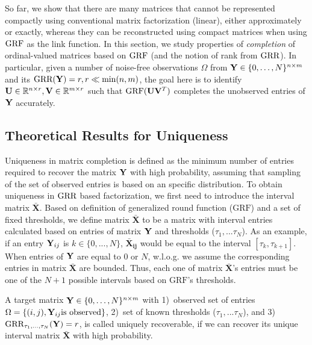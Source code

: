 \documentclass{article}
\newcommand{\sameer}[1]{\todo[color=blue!20]{\textbf{s:} #1}{}}
\begin{document}
So far, we show that there are many matrices that cannot be represented compactly using conventional matrix factorization (linear), either approximately or exactly, whereas they can be reconstructed using compact matrices when using $\text{GRF}$ as the link function.
In this section, we study properties of \emph{completion} of ordinal-valued matrices based on $\text{GRF}$ (and the notion of rank from $\text{GRR}$).
In particular, given a number of noise-free observations $\Omega$ from $\mathbf{Y}\in\{0,\ldots,N\}^{n\times m}$ and its $\text{GRR}(\mathbf{Y})=r, r\ll\min(n,m)$, the goal here is to identify $\mathbf{U}\in{\mathbb{R}}^{n\times r},\mathbf{V}\in{\mathbb{R}}^{m\times r}$ such that $\text{GRF}(\mathbf{U}\mathbf{V}^T)$ completes the unobserved entries of $\mathbf{Y}$ accurately.



\subsection{Theoretical Results for Uniqueness}

Uniqueness in matrix completion is defined as the minimum number of entries required to recover the matrix $\mathbf{Y}$ with high probability, assuming that sampling of the set of observed entries is based on an specific distribution. 
%
To obtain uniqueness in $\text{GRR}$ based factorization, we first need to introduce the interval matrix $\mathbf{\bar{X}}$. 
Based on definition of generalized round function ($\text{GRF}$) and a set of fixed thresholds, we define matrix $\mathbf{\bar X}$ to be a matrix with interval entries calculated based on entries of matrix $\mathbf{Y}$ and thresholds ($\tau_1,...\tau_N$). 
As an example, if an entry $\mathbf{Y}_{ij}$ is $k \in \{0,...,N\}$, $\mathbf{\bar X_{ij}}$ would be equal to the interval $[\tau_k,\tau_{k+1}]$. 
When entries of $\mathbf{Y}$ are equal to $0$ or $N$, w.l.o.g. we assume the corresponding entries in matrix $\mathbf{\bar{X}}$ are bounded. Thus, each one of matrix $\mathbf{\bar X}$'s entries must be one of the $N+1$ possible intervals based on $\text{GRF}$'s thresholds.
\begin{thm:def}
 A target matrix $\mathbf{Y} \in \{0,\ldots,N\}^{n \times m}$ with 1)~observed set of entries $\Omega=\{(i,j), \mathbf{Y}_{ij} \text{is observed}\}$, 2)~set of known thresholds ($\tau_1,...\tau_N$), and 3)~$\text{GRR}_{\tau_1,...,\tau_N}(\mathbf{Y})=r$, is called uniquely recoverable, if we can recover its unique interval matrix $\mathbf{\bar X}$ with high probability.    
\end{thm:def}
\end{document}
